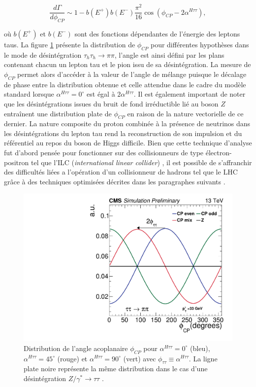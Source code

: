\begin{equation}
    \frac{d\Gamma}{d\phi_{CP}}\sim 1-b(E^+)b(E^-)\frac{\pi^2}{16}\cos(\phi_{CP}-2\alpha^{H\tau\tau}),
\label{crosssection}
\end{equation}

où $b(E^+)$ et $b(E^-)$ sont des fonctions dépendantes de l'énergie des leptons taus. La figure \ref{phiCP2} présente la distribution de $\phi_{CP}$ pour différentes hypothèses dans le mode de désintégration $\tau_h\tau_h\rightarrow\pi\pi$, l'angle est ainsi défini par les plans contenant chacun un lepton tau et le pion issu de sa désintégration. La mesure de $\phi_{CP}$ permet alors d'accéder à la valeur de l'angle de mélange puisque le décalage de phase entre la distribution obtenue et celle attendue dans le cadre du modèle standard lorsque $\alpha^{H\tau\tau}=0^{\circ}$ est égal à $2\alpha^{H\tau\tau}$. Il est également important de noter que les désintégrations issues du bruit de fond irréductible lié au boson $Z$ entraînent une distribution plate de $\phi_{CP}$ en raison de la nature vectorielle de ce dernier. La nature composite du proton combinée à la présence de neutrinos dans les désintégrations du lepton tau rend la reconstruction de son impulsion et du référentiel au repos du boson de Higgs difficile. Bien que cette technique d'analyse fut d'abord pensée pour fonctionner sur des collisionneurs de type électron-positron tel que l'ILC (\textit{international linear collider}) \cite{ILC1,ILC2}, il est possible de s'affranchir des difficultés liées a l'opération d'un collisionneur de hadrons tel que le LHC grâce à des techniques optimisées décrites dans les paragraphes suivants \cite{LHCCP1,LHCCP2,LHCCP3,LHCCP4,LHCCP5}.\\

\begin{figure}
\centering
    \includegraphics[scale=0.4]{Chapitre6/Images/Figure_001.pdf} 
    \caption{Distribution de l'angle acoplanaire $\phi_{CP}$ pour $\alpha^{H\tau\tau}=0^{\circ}$ (bleu), $\alpha^{H\tau\tau}=45^{\circ}$ (rouge) et $\alpha^{H\tau\tau}=90^{\circ}$ (vert) avec $\phi_{\tau\tau}\equiv\alpha^{H\tau\tau}$. La ligne plate noire représente la même distribution dans le cas d'une désintégration $Z/\gamma^*\rightarrow\tau\tau$ \cite{Htautau}.}
    \label{phiCP2}
\end{figure}

